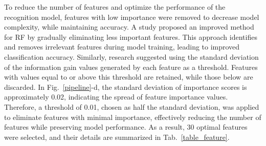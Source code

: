 \documentclass[journal,twoside,web]{ieeecolor}
\begin{document}
To reduce the number of features and optimize the performance of the recognition model, features with low importance were removed to decrease model complexity, while maintaining accuracy. A study \cite{ImportandFeature2023} proposed an improved method for RF by gradually eliminating less important features. This approach identifies and removes irrelevant features during model training, leading to improved classification accuracy. Similarly, research \cite{featureSelection2021} suggested using the standard deviation of the information gain values generated by each feature as a threshold. Features with values equal to or above this threshold are retained, while those below are discarded. In Fig.~\ref{pipeline}-d, the standard deviation of importance scores is approximately 0.02, indicating the spread of feature importance values. Therefore, a threshold of 0.01, chosen as half the standard deviation, was applied to eliminate features with minimal importance, effectively reducing the number of features while preserving model performance. As a result, 30 optimal features were selected, and their details are summarized in Tab.~\ref{table_feature}.
\end{document}
